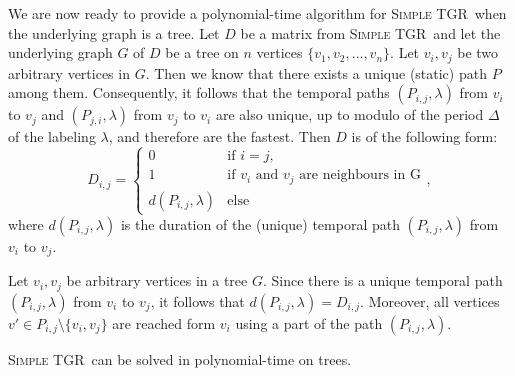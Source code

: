 \documentclass[a4paper,UKenglish,cleveref, autoref, thm-restate,anonymous]{lipics-v2021}
\newcommand{\deltaExact}{\textsc{Simple TGR}}
\begin{document}
We are now ready to provide a polynomial-time algorithm for \deltaExact\ when the underlying graph is a tree.
Let $D$ be a matrix from \deltaExact\ and let the underlying graph $G$ of $D$ be a tree on $n$ vertices $\{v_1, v_2, \dots, v_n\}$.
Let $v_i,v_j$ be two arbitrary vertices in $G$. Then we know that there exists a unique (static) path $P$ among them.
Consequently, it follows that the temporal paths $(P_{i,j},\lambda)$ from $v_i$ to $v_j$ and $(P_{j,i},\lambda)$ from $v_j$ to $v_i$ are also unique, up to modulo of the period $\Delta$ of the labeling $\lambda$,
and therefore are the fastest.
Then $D$ is of the following form:
\begin{equation*}
    D_{i,j} =
    \begin{cases}
    0 & \text{if $i = j$}, \\
    1 & \text{if $v_i$ and $v_j$ are neighbours in G}\\
    d(P_{i,j},\lambda) & \text{else}
    \end{cases},
\end{equation*}
where $d(P_{i,j},\lambda)$ is the duration of the (unique) temporal path $(P_{i,j},\lambda)$ from $v_i$ to $v_j$.

\begin{observation}\label{obs:travel-delays-in-trees}
    Let $v_i,v_j$  be arbitrary vertices in a tree $G$. 
    Since there is a unique temporal path $(P_{i,j},\lambda)$ from $v_i$ to $v_j$, it follows that $d(P_{i,j},\lambda) = D_{i,j}$. 
    Moreover, all vertices $v' \in P_{i,j} \setminus \{v_i,v_j\}$ are reached form $v_i$ using a part of the path $(P_{i,j},\lambda)$.
\end{observation}

\begin{theorem} \label{thm:deltaExact-PolyTimeTrees}
    \deltaExact\ can be solved in polynomial-time on trees.
\end{theorem}
\end{document}
